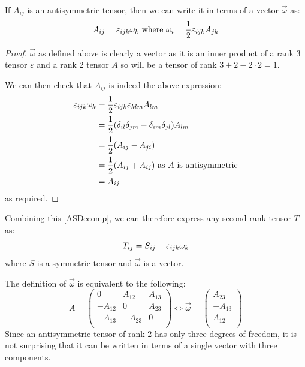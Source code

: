 \documentclass[../main.tex]{subfiles}
\begin{document}
\begin{proposition}
  If $A_{i j}$ is an antisymmetric tensor, then we can write it in terms of a vector $\vec{\omega}$ as:
  \[
    A_{i j} = \varepsilon_{i j k}\omega_k \text{ where } \omega_i = \frac{1}{2}\varepsilon_{i j k}A_{j k}
  \]
\end{proposition}
\begin{proof}
  $\vec{\omega}$ as defined above is clearly a vector as it is an inner product of a rank 3 tensor $\varepsilon$ and a rank 2 tensor $A$ so will be a tensor of rank $3 + 2 - 2 \cdot 2 = 1$.

  We can then check that $A_{i j}$ is indeed the above expression:
  \begin{align*}
    \varepsilon_{i j k}\omega_k &= \frac{1}{2} \varepsilon_{i j k} \varepsilon_{k l m}A_{l m} \\
                          &= \frac{1}{2}(\delta_{i l}\delta_{j m} - \delta_{i m}\delta_{j l})A_{l m} \\
                          &= \frac{1}{2}(A_{i j} - A_{j i}) \\
                          &= \frac{1}{2}(A_{i j} + A_{i j}) \text{ as $A$ is antisymmetric}\\
                          &= A_{i j}
  \end{align*}
  as required.
\end{proof}
Combining this \cref{ASDecomp}, we can therefore express any second rank tensor $T$ as:
\[
  T_{i j} = S_{i j} + \varepsilon_{i j k}\omega_k
\]
where $S$ is a symmetric tensor and $\vec{\omega}$ is a vector.
\begin{remark}
  The definition of $\vec{\omega}$ is equivalent to the following:
  \[
    A = \begin{pmatrix}
    0 & A_{1 2} & A_{1 3} \\
    -A_{1 2} & 0 & A_{2 3} \\
    -A_{1 3} & -A_{2 3} & 0 \\
    \end{pmatrix} \iff \vec{\omega} = \begin{pmatrix}
    A_{2 3} \\
    -A_{1 3} \\
    A_{1 2} \\
    \end{pmatrix}
  \]
  Since an antisymmetric tensor of rank 2 has only three degrees of freedom, it is not surprising that it can be written in terms of a single vector with three components.
\end{remark}
\end{document}
